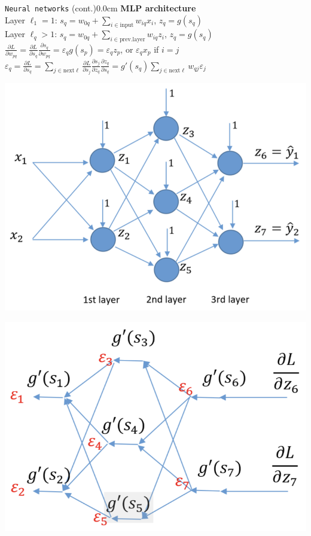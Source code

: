 \documentclass[10pt,3col]{cheatsheet}
\begin{document}
\begin{multicols}{3}
\makecheatsheettitle

\begin{cheatsheetbox}{\texttt{Neural networks} (cont.)}{0.0cm}
    \textbf{MLP architecture}\\
    Layer $\ell_1 = 1$: $s_q = w_{0q} + \sum_{i \in \mathrm{input}} w_{iq}x_i$, $z_q = g(s_q)$\\
    Layer $\ell_q > 1$: $s_q = w_{0q} + \sum_{i \in \mathrm{prev. layer}} w_{iq}z_i$, $z_q = g(s_q)$\\
    $\frac{\partial L}{\partial w_{pq}} = \frac{\partial L}{\partial s_q}\frac{\partial s_q}{\partial w_{pq}} = \varepsilon_q g(s_p) = \varepsilon_q z_p$, or $\varepsilon_qx_p$ if $i = j$\\
    {$\displaystyle \varepsilon_q = \frac{\partial L}{\partial s_q} = \sum_{j \in \mathrm{next \ell}} \frac{\partial L}{\partial s_j}\frac{\partial s_j}{\partial z_q}\frac{\partial z_q}{\partial s_q} = g'(s_q)\sum_{j \in \mathrm{next \ell}} w_{qj}\varepsilon_j$}\\
    \begin{minipage}{.5\textwidth}
        \includegraphics[scale=0.27]{figs/mlp.png}
    \end{minipage}\hfill
    \begin{minipage}{.5\textwidth}
        \includegraphics[scale=0.3]{figs/backprop.png}

\end{minipage}
\end{cheatsheetbox}
\end{multicols}
\end{document}
